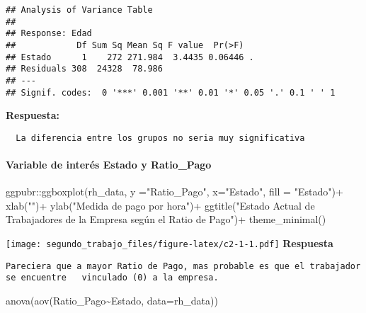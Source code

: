 \documentclass[
]{article}
\newenvironment{Shaded}{\begin{snugshade}}{\end{snugshade}}
\newcommand{\AttributeTok}[1]{\textcolor[rgb]{0.77,0.63,0.00}{#1}}
\newcommand{\FunctionTok}[1]{\textcolor[rgb]{0.00,0.00,0.00}{#1}}
\newcommand{\NormalTok}[1]{#1}
\newcommand{\SpecialCharTok}[1]{\textcolor[rgb]{0.00,0.00,0.00}{#1}}
\newcommand{\StringTok}[1]{\textcolor[rgb]{0.31,0.60,0.02}{#1}}
\begin{document}
\begin{verbatim}
## Analysis of Variance Table
## 
## Response: Edad
##            Df Sum Sq Mean Sq F value  Pr(>F)  
## Estado      1    272 271.984  3.4435 0.06446 .
## Residuals 308  24328  78.986                  
## ---
## Signif. codes:  0 '***' 0.001 '**' 0.01 '*' 0.05 '.' 0.1 ' ' 1
\end{verbatim}

\textbf{Respuesta:}

\begin{verbatim}
  La diferencia entre los grupos no seria muy significativa
\end{verbatim}

\hypertarget{variable-de-interuxe9s-estado-y-ratio_pago}{%
\paragraph{Variable de interés Estado y
Ratio\_Pago}\label{variable-de-interuxe9s-estado-y-ratio_pago}}

\begin{Shaded}
\begin{Highlighting}[]
\NormalTok{ggpubr}\SpecialCharTok{::}\FunctionTok{ggboxplot}\NormalTok{(rh\_data, }\AttributeTok{y =}\StringTok{"Ratio\_Pago"}\NormalTok{, }\AttributeTok{x=}\StringTok{"Estado"}\NormalTok{, }\AttributeTok{fill =} \StringTok{"Estado"}\NormalTok{)}\SpecialCharTok{+}  
  \FunctionTok{xlab}\NormalTok{(}\StringTok{""}\NormalTok{)}\SpecialCharTok{+} \FunctionTok{ylab}\NormalTok{(}\StringTok{"Medida de pago por hora"}\NormalTok{)}\SpecialCharTok{+}
  \FunctionTok{ggtitle}\NormalTok{(}\StringTok{"Estado Actual de Trabajadores de la Empresa según el Ratio de Pago"}\NormalTok{)}\SpecialCharTok{+} \FunctionTok{theme\_minimal}\NormalTok{()}
\end{Highlighting}
\end{Shaded}

\texttt{[image: segundo\_trabajo\_files/figure-latex/c2-1-1.pdf]}
\textbf{Respuesta}

\begin{verbatim}
Pareciera que a mayor Ratio de Pago, mas probable es que el trabajador se encuentre   vinculado (0) a la empresa.
\end{verbatim}

\begin{Shaded}
\begin{Highlighting}[]
\FunctionTok{anova}\NormalTok{(}\FunctionTok{aov}\NormalTok{(Ratio\_Pago}\SpecialCharTok{\textasciitilde{}}\NormalTok{Estado, }\AttributeTok{data=}\NormalTok{rh\_data)) }
\end{Highlighting}
\end{Shaded}
\end{document}
